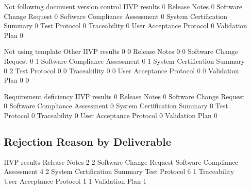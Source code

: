 \documentclass{article}
\begin{document}
\begin{Schunk}
\begin{Soutput}
                                 Not following document version control
  IIVP results                                                        0
  Release Notes                                                       0
  Software Change Request                                             0
  Software Compliance Assessment                                      0
  System Certification Summary                                        0
  Test Protocol                                                       0
  Traceability                                                        0
  User Acceptance Protocol                                            0
  Validation Plan                                                     0
                                
                                 Not using template Other
  IIVP results                                    0     0
  Release Notes                                   0     0
  Software Change Request                         0     1
  Software Compliance Assessment                  0     1
  System Certification Summary                    0     2
  Test Protocol                                   0     0
  Traceability                                    0     0
  User Acceptance Protocol                        0     0
  Validation Plan                                 0     0
                                
                                 Requirement deficiency
  IIVP results                                        0
  Release Notes                                       0
  Software Change Request                             0
  Software Compliance Assessment                      0
  System Certification Summary                        0
  Test Protocol                                       0
  Traceability                                        0
  User Acceptance Protocol                            0
  Validation Plan                                     0
\end{Soutput}
\end{Schunk}


\subsection{Rejection Reason by Deliverable}

\begin{Schunk}
\begin{Soutput}
                  IIVP results                  Release Notes 
                             2                              2 
       Software Change Request Software Compliance Assessment 
                             4                              2 
  System Certification Summary                  Test Protocol 
                             6                              1 
                  Traceability       User Acceptance Protocol 
                             1                              1 
               Validation Plan 
                             1 
\end{Soutput}
\end{Schunk}
\end{document}
